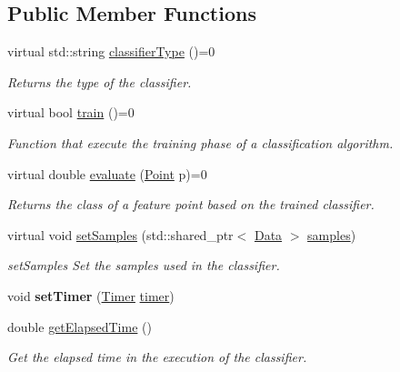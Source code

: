 \subsection*{Public Member Functions}
\begin{DoxyCompactItemize}
\item 
virtual std\+::string \hyperlink{class_classifier_a7bfe7cc88b851b4a7e7ec55b30dd844e}{classifier\+Type} ()=0
\begin{DoxyCompactList}\small\item\em Returns the type of the classifier. \end{DoxyCompactList}\item 
virtual bool \hyperlink{class_classifier_a2306a5de27555ab093593ac9642bc7d9}{train} ()=0
\begin{DoxyCompactList}\small\item\em Function that execute the training phase of a classification algorithm. \end{DoxyCompactList}\item 
virtual double \hyperlink{class_classifier_ae8e9554823b85ddc2dcad2955da811d9}{evaluate} (\hyperlink{class_point}{Point} p)=0
\begin{DoxyCompactList}\small\item\em Returns the class of a feature point based on the trained classifier. \end{DoxyCompactList}\item 
virtual void \hyperlink{class_classifier_a6cbc0189f7fcd1afe68096af8f24c58a}{set\+Samples} (std\+::shared\+\_\+ptr$<$ \hyperlink{class_data}{Data} $>$ \hyperlink{class_classifier_aad6a4fcea8f44339d7a6302f530852ca}{samples})
\begin{DoxyCompactList}\small\item\em set\+Samples Set the samples used in the classifier. \end{DoxyCompactList}\item 
\mbox{\label{class_classifier_aeadfa75f26ea79e525db5767a965da6e}} 
void {\bfseries set\+Timer} (\hyperlink{class_timer}{Timer} \hyperlink{class_classifier_ae9d28253495ae8807d586faff951d46f}{timer})
\item 
double \hyperlink{class_classifier_ab47b67b061041193aa3ae2a7856f4980}{get\+Elapsed\+Time} ()
\begin{DoxyCompactList}\small\item\em Get the elapsed time in the execution of the classifier. \end{DoxyCompactList}\item 

\end{DoxyCompactItemize}
